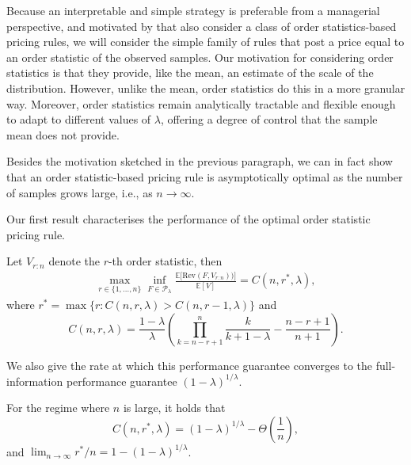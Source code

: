 \documentclass[11pt]{article}
\newcommand{\Rev}{\mathrm{Rev}}
\begin{document}
Because an interpretable and simple strategy is preferable from a managerial perspective, and motivated by \cite{allouah2022pricing} that also consider a class of order statistics-based pricing rules, we will consider the simple family of rules that post a price equal to an order statistic of the observed samples.
Our motivation for considering order statistics is that they provide, like the mean, an estimate of the scale of the distribution. However, unlike the mean, order statistics do this in a more granular way. Moreover, order statistics remain analytically tractable and flexible enough to adapt to different values of $\lambda$, offering a degree of control that the sample mean does not provide.

Besides the motivation sketched in the previous paragraph, we can in fact show that an order statistic-based pricing rule is asymptotically optimal as the number of samples grows large, i.e., as $n \rightarrow \infty$.

Our first result characterises the performance of the optimal order statistic pricing rule. 
\begin{theorem}
    \label{thm:order-statistic-policy}
    Let $V_{r:n}$ denote the $r$-th order statistic, then
    \begin{align*}
        \max_{r\in\{1,\dots,n\}}\inf_{F \in \mathcal{P}_\lambda} \frac{\mathbb{E}\big[\Rev(F,V_{r:n} ))\big]}{\mathbb{E}[V]} = C(n,r^*,\lambda),
    \end{align*}
    where $r^*=\max\{r:C(n,r,\lambda)>C(n,r-1,\lambda)\}$ and
    $$
    C(n,r,\lambda)=\frac{1-\lambda}{\lambda}\left(\prod_{k=n-r+1}^n\frac{k}{k+1-\lambda}-\frac{n-r+1}{n+1}\right).
    $$
\end{theorem}
We also give the rate at which this performance guarantee converges to the full-information performance guarantee $(1- \lambda)^{1/\lambda}$.
\begin{corollary}
    \label{corol:C-n-r-lambda-asymp}
For the regime where $n$ is large, it holds that $$C(n,r^*,\lambda)=(1-\lambda)^{1/\lambda}-\Theta\left(\frac{1}{n}\right),$$
and $\lim_{n \rightarrow \infty} r^*/n = 1-(1-\lambda)^{1/\lambda}$.
\end{corollary}
\end{document}
